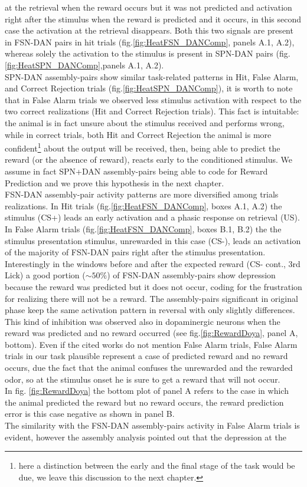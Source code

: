 at the retrieval when the reward occurs but it was not predicted and activation right after the stimulus when the reward is predicted and it occurs, in this second case the activation at the retrieval disappears. Both this two signals are present in FSN-DAN pairs in hit trials (fig.\ref{fig:HeatFSN_DANComp}, panels A.1, A.2), whereas solely the activation to the stimulus is present in SPN-DAN pairs (fig.\ref{fig:HeatSPN_DANComp},panels A.1, A.2).\\
SPN-DAN assembly-pairs show similar task-related patterns in Hit, False Alarm, and Correct Rejection trials (fig.\ref{fig:HeatSPN_DANComp}), it is worth to note that in False Alarm trials we observed less stimulus activation with respect to the two correct realizations (Hit and Correct Rejection trials). This fact is intuitable: the animal is in fact unsure about the stimulus received and performs wrong, while in correct trials, both Hit and Correct Rejection the animal is more confident\footnote{here a distinction between the early and the final stage of the task would be due, we leave this discussion to the next chapter.} about the output will be received, then, being able to predict the reward (or the absence of reward), reacts early to the conditioned stimulus. We assume in fact SPN+DAN assembly-pairs being able to code for Reward Prediction and we prove this hypothesis in the next chapter.\\FSN-DAN assembly-pair activity patterns are more diversified among trials realizations. In Hit trials (fig.\ref{fig:HeatFSN_DANComp}, boxes A.1, A.2) the stimulus (CS+) leads an early activation and a phasic response on retrieval (US). In False Alarm trials (fig.\ref{fig:HeatFSN_DANComp}, boxes B.1, B.2) the the stimulus presentation stimulus, unrewarded in this case (CS-), leads an activation of the majority of FSN-DAN pairs right after the stimulus presentation. Interestingly in the windows before and after the expected reward (CS- cont., 3rd Lick) a good portion ($\sim50\%$) of FSN-DAN assembly-pairs show depression because the reward was predicted but it does not occur, coding for the frustration for realizing there will not be a reward. The assembly-pairs significant in original phase keep the same activation pattern in reversal with only slightly differences.\\This kind of inhibition was observed also in dopaminergic neurons when the reward was predicted and no reward occurred (see fig.\ref{fig:RewardDoya}, panel A, bottom). Even if the cited works do not mention False Alarm trials, False Alarm trials in our task plausible represent a case of predicted reward and no reward occurs, due the fact that the animal confuses the unrewarded and the rewarded odor, so at the stimulus onset he is sure to get a reward that will not occur.\\In fig. \ref{fig:RewardDoya} the bottom plot of panel A refers to the case in which the animal predicted the reward but no reward occurs, the reward prediction error is this case negative as shown in panel B.\\The similarity with the FSN-DAN assembly-pairs activity in False Alarm trials is evident, however the assembly analysis pointed out that the depression at the 